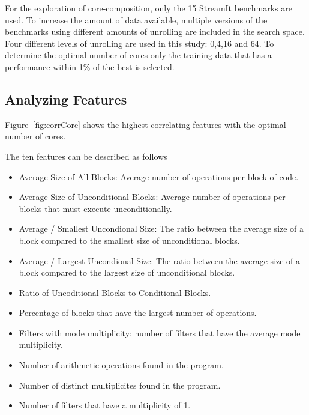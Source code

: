 For the exploration of core-composition, only the 15 StreamIt benchmarks are used.
To increase the amount of data available, multiple versions of the benchmarks using different amounts of unrolling are included in the search space.
Four different levels of unrolling are used in this study: 0,4,16 and 64.
To determine the optimal number of cores only the training data that has a performance within 1\% of the best is selected.

\subsection{Analyzing Features}

Figure~\ref{fig:corrCore} shows the highest correlating features with the optimal number of cores.

The ten features can be described as follows
\begin{itemize}
\item Average Size of All Blocks: Average number of operations per block of code.
\vspace{-1em}
\item Average Size of Unconditional Blocks: Average number of operations per blocks that must execute unconditionally.
\vspace{-1em}
\item Average / Smallest Uncondional Size: The ratio between the average size of a block compared to the smallest size of unconditional blocks.
\vspace{-1em}
\item Average / Largest Uncondional Size: The ratio between the average size of a block compared to the largest size of unconditional blocks.
\vspace{-1em}
\item Ratio of Uncoditional Blocks to Conditional Blocks.
\vspace{-1em}
\item Percentage of blocks that have the largest number of operations.
\vspace{-1em}
\item Filters with mode multiplicity: number of filters that have the average mode multiplicity.
\vspace{-1em}
\item Number of arithmetic operations found in the program.
\vspace{-1em}
\item Number of distinct multiplicites found in the program.
\vspace{-1em}
\item Number of filters that have a multiplicity of 1.
\end{itemize}

